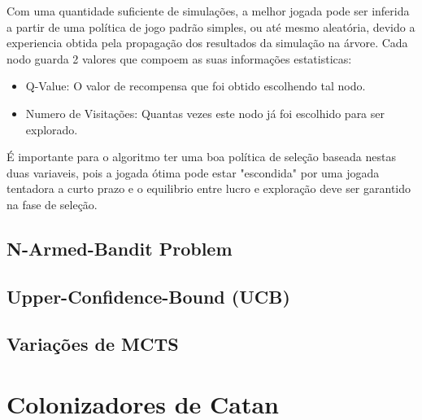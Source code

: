 Com uma quantidade suficiente de simulações, a melhor jogada pode ser inferida a partir de uma política de jogo padrão simples, ou até mesmo aleatória, devido a experiencia obtida pela propagação dos resultados da simulação na árvore.
Cada nodo guarda 2 valores que compoem as suas informações estatisticas:

\begin{itemize}

   \item Q-Value: O valor de recompensa que foi obtido escolhendo tal nodo.
   
   \item Numero de Visitações: Quantas vezes este nodo já foi escolhido para ser explorado.
   
\end{itemize}

É importante para o algoritmo ter uma boa política de seleção baseada nestas duas variaveis, pois a jogada ótima pode estar "escondida" por uma jogada tentadora a curto prazo e o equilibrio entre lucro e exploração deve ser garantido na fase de seleção.

\subsection{\label{sec:secao4.2}N-Armed-Bandit Problem}

\subsection{\label{sec:secao4.3}Upper-Confidence-Bound (UCB)}

\subsection{\label{sec:secao4.4}Variações de MCTS}


\section{\label{sec:secao5}Colonizadores de Catan}







